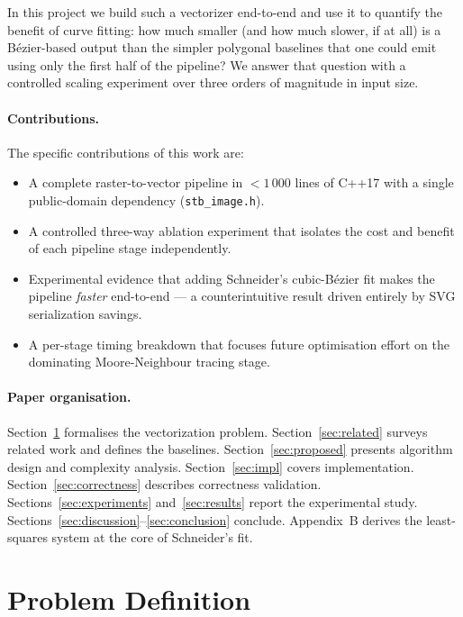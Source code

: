\documentclass[twocolumn,a4paper,10pt]{article}
\begin{document}
In this project we build such a vectorizer end-to-end and use it to
quantify the benefit of curve fitting: how much smaller (and how much
slower, if at all) is a B\'ezier-based output than the simpler
polygonal baselines that one could emit using only the first half of
the pipeline?  We answer that question with a controlled scaling
experiment over three orders of magnitude in input size.

\paragraph*{Contributions.}  The specific contributions of this work are:
\begin{itemize}\setlength\itemsep{1pt}
\item A complete raster-to-vector pipeline in $<\!1\,000$ lines of
  C++17 with a single public-domain dependency (\texttt{stb\_image.h}).
\item A controlled three-way ablation experiment that isolates the cost
  and benefit of each pipeline stage independently.
\item Experimental evidence that adding Schneider's cubic-B\'ezier fit
  makes the pipeline \emph{faster} end-to-end --- a counterintuitive
  result driven entirely by SVG serialization savings.
\item A per-stage timing breakdown that focuses future optimisation
  effort on the dominating Moore-Neighbour tracing stage.
\end{itemize}

\paragraph*{Paper organisation.}
Section~\ref{sec:problem} formalises the vectorization problem.
Section~\ref{sec:related} surveys related work and defines the baselines.
Section~\ref{sec:proposed} presents algorithm design and complexity
analysis.
Section~\ref{sec:impl} covers implementation.
Section~\ref{sec:correctness} describes correctness validation.
Sections~\ref{sec:experiments} and~\ref{sec:results} report the
experimental study.
Sections~\ref{sec:discussion}--\ref{sec:conclusion} conclude.
Appendix~B derives the least-squares system at the core of Schneider's fit.

\section{Problem Definition}
\label{sec:problem}
\end{document}

